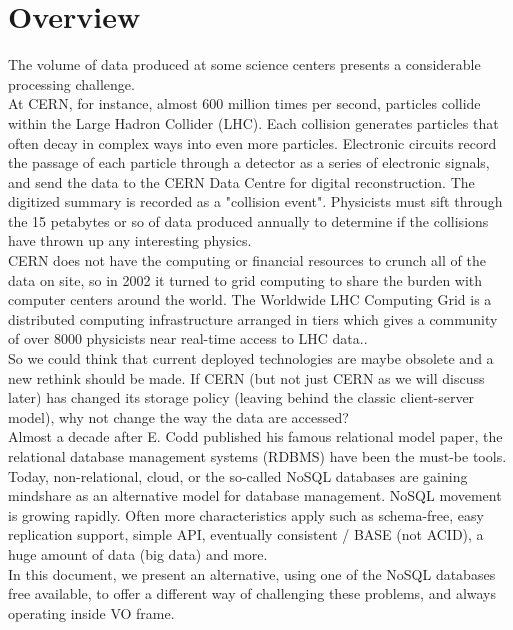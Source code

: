 \chapter{Overview}


The volume of data produced at some science centers presents a considerable processing challenge.\\

At CERN, for instance, almost 600 million times per second, particles collide within the Large Hadron Collider (LHC). Each collision generates particles that often decay in complex ways into even more particles. Electronic circuits record the passage of each particle through a detector as a series of electronic signals, and send the data to the CERN Data Centre for digital reconstruction. The digitized summary is recorded as a "collision event". Physicists must sift through the 15 petabytes or so of data produced annually to determine if the collisions have thrown up any interesting physics. \\

CERN does not have the computing or financial resources to crunch all of the data on site, so in 2002 it turned to grid computing to share the burden with computer centers around the world. The Worldwide LHC Computing Grid is a distributed computing infrastructure arranged in tiers which gives a community of over 8000 physicists near real-time access to LHC data.. \\

So we could think that current deployed technologies are maybe obsolete and a new rethink should be made. If CERN (but not just CERN as we will discuss later) has changed its storage policy (leaving behind the classic client-server model), why not change the way the data are accessed? \\

Almost a decade after E. Codd published his famous relational model paper, the relational database management systems (RDBMS) have been the must-be tools. Today, non-relational, cloud, or the so-called NoSQL databases are gaining mindshare as an alternative model for database management. NoSQL movement is growing rapidly. Often more characteristics apply such as schema-free, easy replication support, simple API, eventually consistent / BASE (not ACID), a huge amount of data (big data) and more.\\

In this document, we present an alternative, using one of the NoSQL databases free available, to offer a different way of challenging these problems, and always operating inside VO frame.